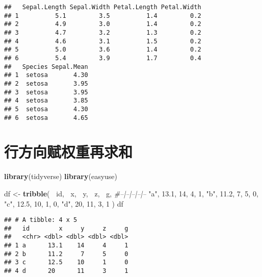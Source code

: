 \documentclass[
]{krantz}
\makeatletter
\newenvironment{Shaded}{\begin{snugshade}}{\end{snugshade}}
\newcommand{\CommentTok}[1]{\textcolor[rgb]{0.37,0.37,0.37}{\textit{#1}}}
\newcommand{\DecValTok}[1]{\textcolor[rgb]{0.06,0.06,0.06}{#1}}
\newcommand{\FloatTok}[1]{\textcolor[rgb]{0.06,0.06,0.06}{#1}}
\newcommand{\KeywordTok}[1]{\textcolor[rgb]{0.27,0.27,0.27}{\textbf{#1}}}
\newcommand{\NormalTok}[1]{#1}
\newcommand{\OperatorTok}[1]{\textcolor[rgb]{0.43,0.43,0.43}{\textbf{#1}}}
\newcommand{\StringTok}[1]{\textcolor[rgb]{0.5,0.5,0.5}{#1}}
\newenvironment{kframe}{%
\medskip{}
\setlength{\fboxsep}{.8em}
 \def\at@end@of@kframe{}%
 \ifinner\ifhmode%
  \def\at@end@of@kframe{\end{minipage}}%
  \begin{minipage}{\columnwidth}%
 \fi\fi%
 \def\FrameCommand##1{\hskip\@totalleftmargin \hskip-\fboxsep
 \colorbox{shadecolor}{##1}\hskip-\fboxsep
     \hskip-\linewidth \hskip-\@totalleftmargin \hskip\columnwidth}%
 \MakeFramed {\advance\hsize-\width
   \@totalleftmargin\z@ \linewidth\hsize
   \@setminipage}}%
 {\par\unskip\endMakeFramed%
 \at@end@of@kframe}
\renewenvironment{Shaded}{\begin{kframe}}{\end{kframe}}
\makeatother
\begin{document}
\begin{verbatim}
##   Sepal.Length Sepal.Width Petal.Length Petal.Width
## 1          5.1         3.5          1.4         0.2
## 2          4.9         3.0          1.4         0.2
## 3          4.7         3.2          1.3         0.2
## 4          4.6         3.1          1.5         0.2
## 5          5.0         3.6          1.4         0.2
## 6          5.4         3.9          1.7         0.4
##   Species Sepal.Mean
## 1  setosa       4.30
## 2  setosa       3.95
## 3  setosa       3.95
## 4  setosa       3.85
## 5  setosa       4.30
## 6  setosa       4.65
\end{verbatim}

\hypertarget{ux884cux65b9ux5411ux8d4bux6743ux91cdux518dux6c42ux548c}{%
\section{行方向赋权重再求和}\label{ux884cux65b9ux5411ux8d4bux6743ux91cdux518dux6c42ux548c}}

\begin{Shaded}
\begin{Highlighting}[]
\KeywordTok{library}\NormalTok{(tidyverse)}
\KeywordTok{library}\NormalTok{(easyuse)}
\end{Highlighting}
\end{Shaded}

\begin{Shaded}
\begin{Highlighting}[]
\NormalTok{df <-}\StringTok{ }\KeywordTok{tribble}\NormalTok{(}
   \OperatorTok{~}\NormalTok{id, }\OperatorTok{~}\NormalTok{x, }\OperatorTok{~}\NormalTok{y, }\OperatorTok{~}\NormalTok{z, }\OperatorTok{~}\NormalTok{g,}
   \CommentTok{#--|--|--|--|--}
   \StringTok{"a"}\NormalTok{, }\FloatTok{13.1}\NormalTok{, }\DecValTok{14}\NormalTok{, }\DecValTok{4}\NormalTok{, }\DecValTok{1}\NormalTok{,}
   \StringTok{"b"}\NormalTok{, }\FloatTok{11.2}\NormalTok{, }\DecValTok{7}\NormalTok{, }\DecValTok{5}\NormalTok{, }\DecValTok{0}\NormalTok{,}
   \StringTok{"c"}\NormalTok{, }\FloatTok{12.5}\NormalTok{, }\DecValTok{10}\NormalTok{, }\DecValTok{1}\NormalTok{, }\DecValTok{0}\NormalTok{,}
   \StringTok{"d"}\NormalTok{, }\DecValTok{20}\NormalTok{, }\DecValTok{11}\NormalTok{, }\DecValTok{3}\NormalTok{, }\DecValTok{1}
\NormalTok{   )}
\NormalTok{df  }
\end{Highlighting}
\end{Shaded}

\begin{verbatim}
## # A tibble: 4 x 5
##   id        x     y     z     g
##   <chr> <dbl> <dbl> <dbl> <dbl>
## 1 a      13.1    14     4     1
## 2 b      11.2     7     5     0
## 3 c      12.5    10     1     0
## 4 d      20      11     3     1
\end{verbatim}
\end{document}
